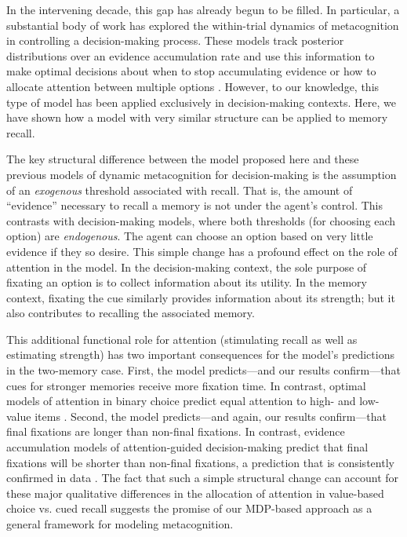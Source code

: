 In the intervening decade, this gap has already begun to be filled. In particular, a substantial body of work has explored the within-trial dynamics of metacognition in controlling a decision-making process. These models track posterior distributions over an evidence accumulation rate and use this information to make optimal decisions about when to stop accumulating evidence \citep{drugowitsch2012cost,woodford2014stochastic,bitzer2014perceptual,fudenberg2018speed,tajima2019optimal} or how to allocate attention between multiple options \citep{jang2021optimal,callaway2021fixation}. However, to our knowledge, this type of model has been applied exclusively in decision-making contexts. Here, we have shown how a model with very similar structure can be applied to memory recall. 

The key structural difference between the model proposed here and these previous models of dynamic metacognition for decision-making is the assumption of an \emph{exogenous} threshold associated with recall. That is, the amount of ``evidence'' necessary to recall a memory is not under the agent's control. This contrasts with decision-making models, where both thresholds (for choosing each option) are \emph{endogenous}. The agent can choose an option based on very little evidence if they so desire. This simple change has a profound effect on the role of attention in the model. In the decision-making context, the sole purpose of fixating an option is to collect information about its utility. In the memory context, fixating the cue similarly provides information about its strength; but it also contributes to recalling the associated memory. 

This additional functional role for attention (stimulating recall as well as estimating strength) has two important consequences for the model's predictions in the two-memory case. First, the model predicts---and our results confirm---that cues for stronger memories receive more fixation time. In contrast, optimal models of attention in binary choice predict equal attention to high- and low-value items \citep{callaway2021fixation,jang2021optimal,fudenberg2018speed}.
Second, the model predicts---and again, our results confirm---that final fixations are longer than non-final fixations. In contrast, evidence accumulation models of attention-guided decision-making predict that final fixations will be shorter than non-final fixations, a prediction that is consistently confirmed in data \citep{krajbich2010visual,krajbich2011multialternative,tavares2017attentional}. The fact that such a simple structural change can account for these major qualitative differences in the allocation of attention in value-based choice vs. cued recall suggests the promise of our MDP-based approach as a general framework for modeling metacognition.


